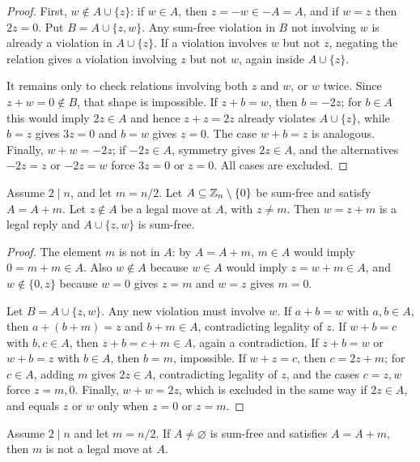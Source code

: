\begin{proof}
First, $w\notin A\cup\{z\}$: if $w\in A$, then $z=-w\in -A=A$, and if $w=z$ then
$2z=0$. Put $B=A\cup\{z,w\}$. Any sum-free violation in $B$ not involving $w$ is already
a violation in $A\cup\{z\}$. If a violation involves $w$ but not $z$, negating the relation
gives a violation involving $z$ but not $w$, again inside $A\cup\{z\}$.

It remains only to check relations involving both $z$ and $w$, or $w$ twice. Since
$z+w=0\notin B$, that shape is impossible. If $z+b=w$, then $b=-2z$; for $b\in A$ this
would imply $2z\in A$ and hence $z+z=2z$ already violates $A\cup\{z\}$, while
$b=z$ gives $3z=0$ and $b=w$ gives $z=0$. The case $w+b=z$ is analogous. Finally,
$w+w=-2z$; if $-2z\in A$, symmetry gives $2z\in A$, and the alternatives $-2z=z$ or
$-2z=w$ force $3z=0$ or $z=0$. All cases are excluded.
\end{proof}

\begin{lemma}
\label{lem:sumfree-translation}
Assume $2\mid n$, and let $m=n/2$. Let $A\subseteq \mathbb{Z}_{n}\setminus\{0\}$ be sum-free and
satisfy $A=A+m$. Let $z\notin A$ be a legal move at $A$, with $z\neq m$. Then
$w=z+m$ is a legal reply and $A\cup\{z,w\}$ is sum-free.
\end{lemma}

\begin{proof}
The element $m$ is not in $A$: by $A=A+m$, $m\in A$ would imply $0=m+m\in A$. Also
$w\notin A$ because $w\in A$ would imply $z=w+m\in A$, and $w\notin\{0,z\}$ because
$w=0$ gives $z=m$ and $w=z$ gives $m=0$.

Let $B=A\cup\{z,w\}$. Any new violation must involve $w$. If $a+b=w$ with
$a,b\in A$, then $a+(b+m)=z$ and $b+m\in A$, contradicting legality of $z$. If
$w+b=c$ with $b,c\in A$, then $z+b=c+m\in A$, again a contradiction. If $z+b=w$
or $w+b=z$ with $b\in A$, then $b=m$, impossible. If $w+z=c$, then
$c=2z+m$; for $c\in A$, adding $m$ gives $2z\in A$, contradicting legality of $z$,
and the cases $c=z,w$ force $z=m,0$. Finally, $w+w=2z$, which is excluded in the
same way if $2z\in A$, and equals $z$ or $w$ only when $z=0$ or $z=m$.
\end{proof}

\begin{lemma}
\label{lem:sumfree-m-self-blocks}
Assume $2\mid n$ and let $m=n/2$. If $A\neq\varnothing$ is sum-free and satisfies
$A=A+m$, then $m$ is not a legal move at $A$.
\end{lemma}

